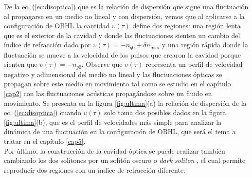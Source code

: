De la ec. (\ref{ec:disoptica}) que es la relaci\'{o}n de dispersi\'{o}n que sigue una fluctuaci\'{o}n al propagarse en un medio no lineal y con dispersi\'{o}n, vemos que al aplicarse a la configuraci\'{o}n de OBHL la cantidad $\upsilon(\tau)$ define dos regiones: una regi\'{o}n lenta que es el exterior de la cavidad y donde las fluctuaciones sienten un cambio del \'{i}ndice de refracci\'{o}n dado por $\upsilon(\tau)=-n_{g0}+\delta n_{\text{max}}$ y una regi\'{o}n r\'apida donde la fluctuaci\'{o}n se mueve a la velocidad de los pulsos que crearon la cavidad porque sienten que $\upsilon(\tau)=-n_{g0}$. Observe que $\upsilon(\tau)$ representa un perfil de velocidad negativo y adimensional del medio no lineal y las fluctuaciones \'{o}pticas se propagan sobre este medio en movimiento tal como se estudio en el cap\'{i}tulo \ref{cap2} con las fluctuaciones ac\'{u}sticas propag\'{a}ndose sobre un fluido en movimiento. Se presenta en la figura \ref{fig:ultima}(a) la relaci\'{o}n de dispersi\'{o}n de la ec. (\ref{ec:disoptica}) cuando $\upsilon(\tau)$ solo toma dos posibles dados en la figura \ref{fig:ultima}(b), que es el perfil de velocidades m\'{a}s simple para analizar la din\'{a}mica de una fluctuaci\'{o}n en la configuraci\'{o}n de OBHL, que ser\'{a} el tema a tratar en el cap\'{i}tulo \ref{cap5}.\\

Por \'{u}ltimo, la construcci\'{o}n de la cavidad \'{o}ptica se puede realizar tambi\'{e}n cambiando los dos solitones por un solit\'{o}n oscuro o \textit{dark soliton} \citep{weiner1988experimental}, el cual permite reproducir dos regiones con un \'{i}ndice de refracci\'{o}n diferente.\\
